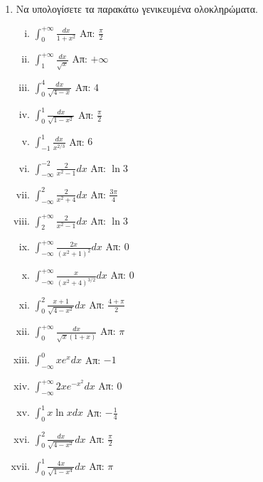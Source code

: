 



\pagestyle{askhseis}
\everymath{\displaystyle}




\begin{center}
  \minibox{\large \bfseries \textcolor{Col1}{Ασκήσεις στα Γενικευμένα Ολοκληρώματα}}
\end{center}

\vspace{\baselineskip}


\begin{enumerate}

\item Να υπολογίσετε τα παρακάτω γενικευμένα ολοκληρώματα.

\begin{enumerate}[i)]
\item $\int_{0}^{+\infty} \frac{dx}{1+x^2}$ \hfill Απ: $\frac{\pi}{2}$
\item $\int_{1}^{+\infty}\frac{dx}{\sqrt{x}}$ \hfill Απ: $+\infty$
\item $\int_{0}^{4}\frac{dx}{\sqrt{4-x}}$ \hfill Απ: $4$
\item $\int_{0}^{1}\frac{dx}{\sqrt{1-x^2}}$ \hfill Απ: $\frac{\pi}{2}$
\item $\int_{-1}^{1}\frac{dx}{x^{2/3}}$ \hfill Απ: $6$
\item $\int_{-\infty}^{-2}\frac{2}{x^2-1}dx$ \hfill Απ: $\ln 3$
\item $\int_{-\infty}^{2}\frac{2}{x^2+4}dx$ \hfill Απ: $\frac{3\pi}{4}$
\item $\int_{2}^{+\infty}\frac{2}{x^2-1}dx$ \hfill Απ: $\ln 3$
\item $\int_{-\infty}^{+\infty}\frac{2x}{(x^2+1)^2}dx$ \hfill Απ: $0$
\item $\int_{-\infty}^{+\infty}\frac{x}{(x^2+4)^{3/2}}dx$ \hfill Απ: $0$
\item $\int_{0}^{2}\frac{x+1}{\sqrt{4-x^2}}dx$ \hfill Απ: $\frac{4+\pi}{2}$
\item $\int_{0}^{+\infty}\frac{dx}{\sqrt{x}(1+x)}$ \hfill Απ: $\pi$
\item $\int_{-\infty}^{0}xe^x dx$ \hfill Απ: $-1$
\item $\int_{-\infty}^{+\infty}2xe^{-x^2}dx$ \hfill Απ: $0$
\item $\int_{0}^{1}x\ln x dx$ \hfill Απ: $-\frac{1}{4}$
\item $\int_{0}^{2}\frac{dx}{\sqrt{4-x^2}}dx$ \hfill Απ: $\frac{\pi}{2}$
\item $\int_{0}^{1}\frac{4x}{\sqrt{1-x^4}}dx$ \hfill Απ: $\pi$
\end{enumerate}
\end{enumerate}






